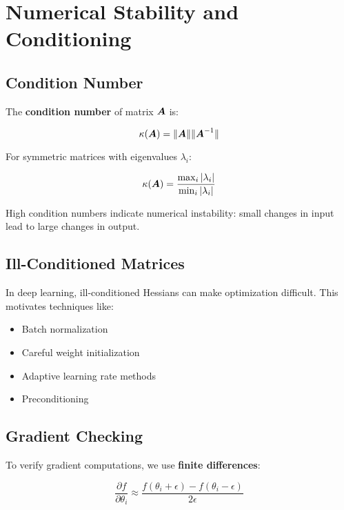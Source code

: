 
\section{Numerical Stability and Conditioning}
\label{sec:numerical-stability}

\subsection{Condition Number}

The \textbf{condition number} of matrix $\boldsymbol{A}$ is:

\begin{equation}
\kappa(\boldsymbol{A}) = \|\boldsymbol{A}\| \|\boldsymbol{A}^{-1}\|
\end{equation}

For symmetric matrices with eigenvalues $\lambda_i$:

\begin{equation}
\kappa(\boldsymbol{A}) = \frac{\max_i |\lambda_i|}{\min_i |\lambda_i|}
\end{equation}

High condition numbers indicate numerical instability: small changes in input lead to large changes in output.

\subsection{Ill-Conditioned Matrices}

In deep learning, ill-conditioned Hessians can make optimization difficult. This motivates techniques like:
\begin{itemize}
    \item Batch normalization
    \item Careful weight initialization
    \item Adaptive learning rate methods
    \item Preconditioning
\end{itemize}

\subsection{Gradient Checking}

To verify gradient computations, we use \textbf{finite differences}:

\begin{equation}
\frac{\partial f}{\partial \theta_i} \approx \frac{f(\theta_i + \epsilon) - f(\theta_i - \epsilon)}{2\epsilon}
\end{equation}

